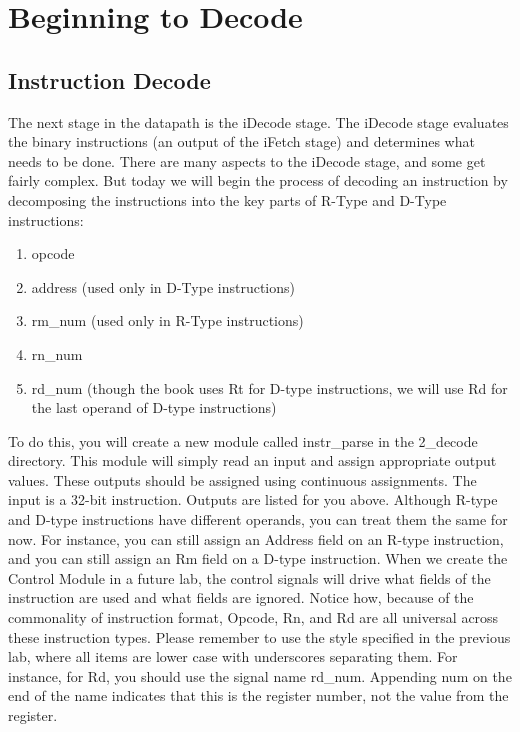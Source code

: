 \chapter{Beginning to Decode}

\section{Instruction Decode}

The next stage in the datapath is the iDecode stage.  The iDecode stage evaluates the binary instructions (an output of the iFetch stage) and determines what needs to be done.  There are many aspects to the iDecode stage, and some get fairly complex.  But today we will begin the process of decoding an instruction by decomposing the instructions into the key parts of R-Type and D-Type instructions:
\begin{enumerate}
	\item opcode
	\item address (used only in D-Type instructions)
	\item rm\_num (used only in R-Type instructions)
	\item rn\_num
	\item rd\_num (though the book uses Rt for D-type instructions, we will use Rd for the last operand of D-type instructions)
\end{enumerate}   

To do this, you will create a new module called instr\_parse in the 2\_decode directory.  This module will simply read an input and assign appropriate output values.  These outputs should be assigned using continuous assignments.  The input is a 32-bit instruction.  Outputs are listed for you above.  Although R-type and D-type instructions have different operands, you can treat them the same for now.  For instance, you can still assign an Address field on an R-type instruction, and you can still assign an Rm field on a D-type instruction.  When we create the Control Module in a future lab, the control signals will drive what fields of the instruction are used and what fields are ignored.  Notice how, because of the commonality of instruction format, Opcode, Rn, and Rd are all universal across these instruction types.  Please remember to use the style specified in the previous lab, where all items are lower case with underscores separating them.  For instance, for Rd, you should use the signal name rd\_num.  Appending num on the end of the name indicates that this is the register number, not the value from the register.

